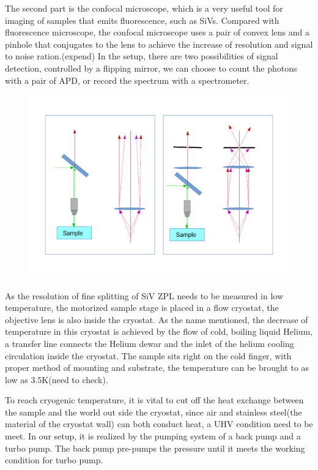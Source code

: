 The second part is the confocal microscope, which is a very useful tool for imaging of samples that emits fluorescence, such as SiVs. Compared with fluorescence microscope, the confocal microscope uses a pair of convex lens and a pinhole that conjugates to the lens to achieve the increase of resolution and signal to noise ration.(expend)
In the setup, there are two possibilities of signal detection, controlled by a flipping mirror, we can choose to count the photons with a pair of APD, or record the spectrum with a spectrometer.
\begin{figure}[h]
\centering
\includegraphics[width=1\linewidth]{Figures/pic/microscope}
\caption{}
\label{fig:microscope}
\end{figure}

As the resolution of fine splitting of SiV ZPL needs to be measured in low temperature, the motorized sample stage is placed in a flow cryostat, the objective lens is also inside the cryostat. As the name mentioned, the decrease of temperature in this cryostat is achieved by the flow of cold, boiling liquid Helium, a transfer line connects the Helium dewar and the inlet of the helium cooling circulation inside the cryostat. The sample sits right on the cold finger, with proper method of mounting and substrate, the temperature can be brought to as low as 3.5K(need to check).

To reach cryogenic temperature, it is vital to cut off the heat exchange between the sample and the world out side the cryostat, since air and stainless steel(the material of the cryostat wall) can both conduct heat, a UHV condition need to be meet. In our setup, it is realized by the pumping system of a back pump and a turbo pump. The back pump pre-pumps the pressure until it meets the working condition for turbo pump.

